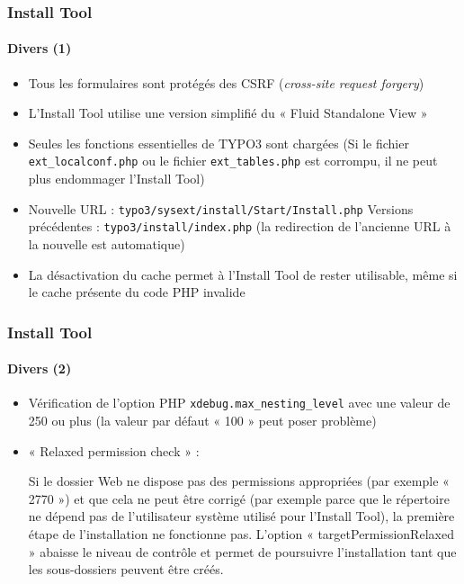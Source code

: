
\begin{frame}[fragile]
	\frametitle{Install Tool}
	\framesubtitle{Divers (1)}

	\begin{itemize}
		\item Tous les formulaires sont protégés des CSRF (\textit{cross-site request forgery})
		\item L'Install Tool utilise une version simplifié du « Fluid Standalone View »
		\item Seules les fonctions essentielles de TYPO3 sont chargées\newline
			(Si le fichier \texttt{ext\_localconf.php} ou le fichier \texttt{ext\_tables.php} est corrompu, il ne peut plus endommager l'Install Tool)
		\item Nouvelle URL : \tabto{2.6cm} \texttt{typo3/sysext/install/Start/Install.php}\newline
			Versions précédentes :\newline
			\texttt{typo3/install/index.php}\newline
			(la redirection de l'ancienne URL à la nouvelle est automatique)
		\item La désactivation du cache permet à l'Install Tool de rester utilisable, même si le cache présente du code PHP invalide
	\end{itemize}

\end{frame}


\begin{frame}[fragile]
	\frametitle{Install Tool}
	\framesubtitle{Divers (2)}

	\begin{itemize}
		\item Vérification de l'option PHP \texttt{xdebug.max\_nesting\_level} avec une valeur de 250 ou plus (la valeur par défaut « 100 » peut poser problème)
		\item « Relaxed permission check » :

			\small
				Si le dossier Web ne dispose pas des permissions appropriées (par exemple « 2770 »)
				et que cela ne peut être corrigé (par exemple parce que le répertoire ne dépend pas
				de l'utilisateur système utilisé pour l'Install Tool), la première étape de l'installation
				ne fonctionne pas.
				L'option « targetPermissionRelaxed » abaisse le niveau de contrôle et permet de poursuivre l'installation tant que les sous-dossiers peuvent être créés.
			\normalsize

	\end{itemize}

\end{frame}

